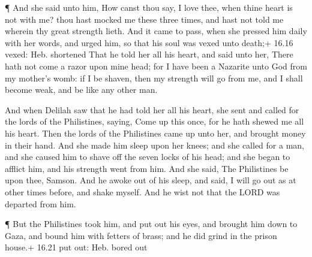  ¶ And she said unto him, How canst thou say, I love thee,
when thine heart is not with me? thou hast mocked me these three times,
and hast not told me wherein thy great strength lieth.  And
it came to pass, when she pressed him daily with her words, and urged
him, so that his soul was vexed unto death;+ 16.16 vexed: Heb. shortened
 That he told her all his heart, and said unto her, There
hath not come a razor upon mine head; for I have been a Nazarite unto
God from my mother's womb: if I be shaven, then my strength will go from
me, and I shall become weak, and be like any other man.

 And when Delilah saw that he had told her all his heart,
she sent and called for the lords of the Philistines, saying, Come up
this once, for he hath shewed me all his heart. Then the lords of the
Philistines came up unto her, and brought money in their hand.
 And she made him sleep upon her knees; and she called for
a man, and she caused him to shave off the seven locks of his head; and
she began to afflict him, and his strength went from him. 
And she said, The Philistines be upon thee, Samson. And he awoke out of
his sleep, and said, I will go out as at other times before, and shake
myself. And he wist not that the LORD was departed from him.

 ¶ But the Philistines took him, and put out his eyes, and
brought him down to Gaza, and bound him with fetters of brass; and he
did grind in the prison house.+ 16.21 put out: Heb. bored out

